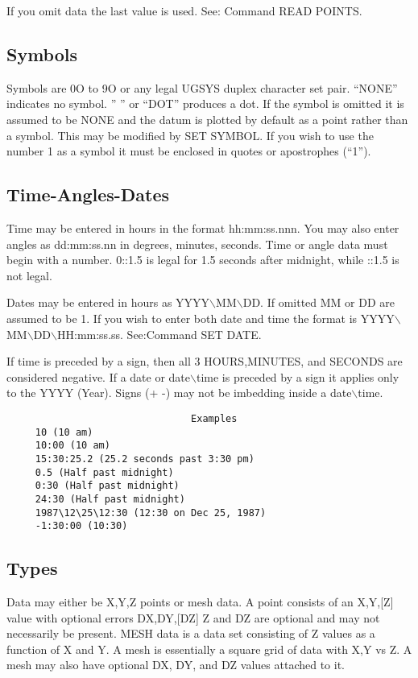 If you omit data the last value is used.  See: Command READ POINTS.  
\subsection{Symbols}
Symbols  are  0O  to  9O  or  any  legal UGSYS duplex character set pair.
``NONE'' indicates no symbol.  ''  '' or ``DOT'' produces a dot.  If the symbol
is  omitted  it is assumed to be NONE and the datum is plotted by default
as a point rather than a symbol.  This may be modified by SET SYMBOL.  If
you wish to use the number 1 as a symbol it must be enclosed in quotes or
apostrophes (``1'').  
\subsection{Time-Angles-Dates}
Time  may  be  entered in hours in the format hh:mm:ss.nnn.  You may also
enter angles as dd:mm:ss.nn in degrees, minutes, seconds.  Time or  angle
data  must  begin  with  a number.  0::1.5 is legal for 1.5 seconds after
midnight, while ::1.5 is not legal.  

Dates  may  be  entered  in hours as YYYY$\backslash$MM$\backslash$DD.  If omitted MM or DD are
assumed to be 1.  If you wish to enter both date and time the  format  is
YYYY$\backslash$MM$\backslash$DD$\backslash$HH:mm:ss.ss.  See:Command SET DATE.  

If  time is preceded by a sign, then all 3 HOURS,MINUTES, and SECONDS are
considered negative.  If a date or date$\backslash$time is preceded  by  a  sign  it
applies only to the YYYY (Year).  Signs (+ -) may not be imbedding inside
a date$\backslash$time.  

\begin{verbatim}
                                Examples
     10 (10 am) 
     10:00 (10 am) 
     15:30:25.2 (25.2 seconds past 3:30 pm) 
     0.5 (Half past midnight) 
     0:30 (Half past midnight) 
     24:30 (Half past midnight) 
     1987\12\25\12:30 (12:30 on Dec 25, 1987) 
     -1:30:00 (10:30) 
\end{verbatim}
\subsection{Types}
Data  may  either  be  X,Y,Z points or mesh data.  A point consists of an
X,Y,[Z] value with optional errors DX,DY,[DZ] Z and DZ are  optional  and
may  not necessarily be present.  MESH data is a data set consisting of Z
values as a function of X and Y.  A mesh is essentially a square grid  of
data  with X,Y vs Z.  A mesh may also have optional DX, DY, and DZ values
attached to it.  

